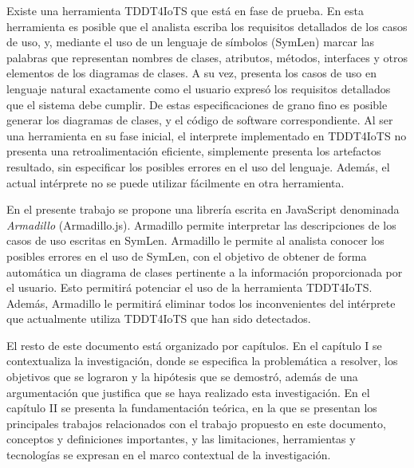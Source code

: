 Existe una herramienta TDDT4IoTS \parencite{tddt4iots} que está en fase de prueba. En esta herramienta es posible que el analista escriba los requisitos detallados de los casos de uso, y, mediante el uso de un lenguaje de símbolos (SymLen) marcar las palabras que representan nombres de clases, atributos, métodos, interfaces y otros elementos de los diagramas de clases. A su vez, presenta los casos de uso en lenguaje natural exactamente como el usuario expresó los requisitos detallados que el sistema debe cumplir. De estas especificaciones de grano fino es posible generar los diagramas de clases, y el código de software correspondiente. Al ser una herramienta en su fase inicial, el interprete implementado en TDDT4IoTS no presenta una retroalimentación eficiente, simplemente presenta los artefactos resultado, sin especificar los posibles errores en el uso del lenguaje. Además, el actual intérprete no se puede utilizar fácilmente en otra herramienta.

En el presente trabajo se propone una librería escrita en JavaScript denominada \textit{Armadillo} (Armadillo.js). Armadillo permite interpretar las descripciones de los casos de uso  escritas en SymLen. Armadillo le permite al analista conocer los posibles errores en el uso de SymLen, con el objetivo de obtener de forma automática un diagrama de clases pertinente a la información proporcionada por el usuario. Esto permitirá potenciar el uso de la herramienta TDDT4IoTS. Además, Armadillo le permitirá eliminar todos los inconvenientes del intérprete que actualmente utiliza TDDT4IoTS que han sido detectados.

El resto de este documento está organizado por capítulos. En el capítulo I se contextualiza la investigación, donde se especifica la problemática a resolver, los objetivos que se lograron y la hipótesis que se demostró, además de una argumentación que justifica que se haya realizado esta investigación. En el capítulo II se presenta la fundamentación teórica, en la que se presentan los principales trabajos relacionados con el trabajo propuesto en este documento, conceptos y definiciones importantes, y las limitaciones, herramientas y tecnologías se expresan en el marco contextual de la investigación.

